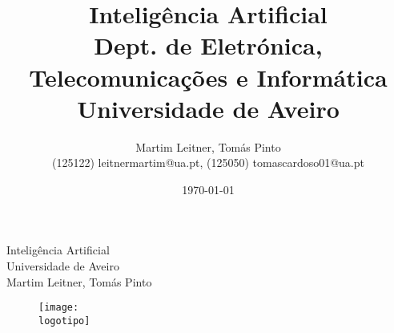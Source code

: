 \documentclass{report}
\begin{document}
%
\def\titulo{Inteligência Artificial}
\def\data{DATA}
\def\autores{Martim Leitner, Tomás Pinto}
\def\autorescontactos{(125122) leitnermartim@ua.pt, (125050) tomascardoso01@ua.pt}
\def\departamento{Dept. de Eletrónica, Telecomunicações e Informática}
\def\empresa{Universidade de Aveiro}
\def\logotipo{imagens/ua.pdf}
\def\repo{infor2024-ap--infor2024-ap-g11}
%
%
\begin{titlepage}

\begin{center}
%
\vspace*{50mm}
%
{\Huge \titulo}\\ 
%
\vspace{10mm}
%
{\Large \empresa}\\
%
\vspace{10mm}
%
{\LARGE \autores}\\ 
%
\vspace{30mm}
%
\begin{figure}[ht]
\center
\texttt{[image: \\logotipo]}
\end{figure}
%
\vspace{30mm}
\end{center}
%
\begin{flushright}
\end{flushright}
\end{titlepage}

\title{%
{\Huge\textbf{\titulo}}\\
\vspace{15mm}
{\Large \departamento\\ \empresa}
}
%
\author{%
    \autores \\
    \autorescontactos
}

%
\date{\today}
%
\maketitle

\end{document}
